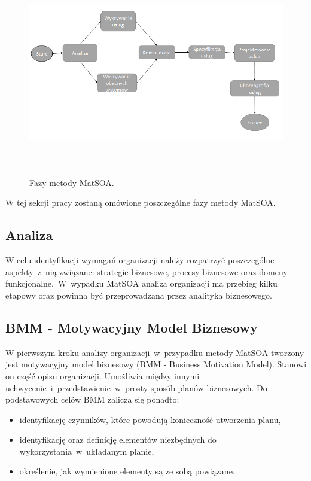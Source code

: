 \begin{figure}[h!tbp]
\begin{centering}
\includegraphics[width=15cm, height=9cm]{img/MetMatSOA_v2.png}
\caption[Fazy metody MatSOA.]{Fazy metody MatSOA.}\label{soam_lifecycle}
\end{centering}
\end{figure}


W tej sekcji pracy zostaną omówione poszczególne fazy metody MatSOA.

\subsection{Analiza}
W celu identyfikacji wymagań organizacji należy rozpatrzyć poszczególne aspekty~z~nią związane: strategie biznesowe, procesy biznesowe oraz domeny funkcjonalne.~W~wypadku MatSOA analiza organizacji ma przebieg kilku etapowy oraz powinna być przeprowadzana przez analityka biznesowego.

\subsection*{BMM - Motywacyjny Model Biznesowy}
W pierwszym kroku analizy organizacji~w~przypadku metody MatSOA tworzony jest motywacyjny model biznesowy (BMM - Business Motivation Model). Stanowi on część opisu organizacji. Umożliwia między innymi uchwycenie~i~przedstawienie~w~prosty sposób planów biznesowych. Do podstawowych celów BMM zalicza się ponadto:
\begin{itemize}
\item{identyfikację czynników, które powodują konieczność utworzenia planu,}
\item{identyfikację oraz definicję elementów niezbędnych do wykorzystania~w~układanym planie,}
\item{określenie, jak wymienione elementy są ze sobą powiązane.}
\end{itemize}

